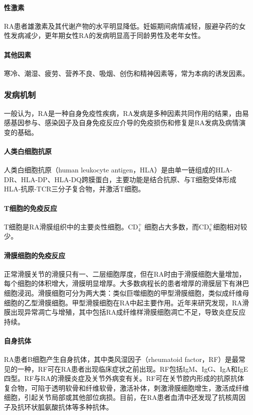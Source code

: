 \paragraph{性激素}

RA患者雄激素及其代谢产物的水平明显降低。妊娠期间病情减轻，服避孕药的女性发病减少，更年期女性RA的发病明显高于同龄男性及老年女性。
\paragraph{其他因素}

寒冷、潮湿、疲劳、营养不良、吸烟、创伤和精神因素等，常为本病的诱发因素。

\subsubsection{发病机制}

一般认为，RA是一种自身免疫性疾病，RA发病是多种因素共同作用的结果，由易感基因参与、感染因子及自身免疫反应介导的免疫损伤和修复是RA发病及病情演变的基础。
\paragraph{人类白细胞抗原}

人类白细胞抗原（human leukocyte
antigen，HLA）是由单一链组成的HLA-DR、HLA-DP、HLA-DQ跨膜蛋白，主要功能是结合抗原、与T细胞受体形成HLA-抗原-TCR三分子复合物，并激活T细胞。
\paragraph{T细胞的免疫反应}

T细胞是RA滑膜组织中的主要炎性细胞。CD$_4^+$
细胞占大多数，而CD$_8^+$细胞相对较少。
\paragraph{滑膜细胞的免疫反应}

正常滑膜关节的滑膜只有一、二层细胞厚度，但在RA时由于滑膜细胞大量增加，每个细胞的体积增大，滑膜明显增厚。大多数病程长的患者增厚的滑膜层下有淋巴细胞浸润。滑膜细胞可分为两大类：类似巨噬细胞的甲型滑膜细胞，类似成纤维母细胞的乙型滑膜细胞。甲型滑膜细胞在RA中起主要作用。近年来研究发现，RA滑膜出现异常凋亡与增殖，其中包括RA成纤维样滑膜细胞凋亡不足，导致炎症反应持续。
\paragraph{自身抗体}

RA患者B细胞产生自身抗体，其中类风湿因子（rheumatoid
factor，RF）是最常见的一种，RF可在RA患者出现临床症状之前出现。RF包括IgM、IgG、IgA和IgE四型。RF与RA的滑膜炎症及关节外病变有关。RF可在关节腔内形成的抗原抗体复合物，可陷于透明软骨和纤维软骨，激活补体，刺激滑膜细胞增生，激活成纤维细胞，引起关节局部或其他部位病损。目前，在RA患者血清中还发现了抗核周因子及抗环状胍氨酸抗体等多种抗体。

